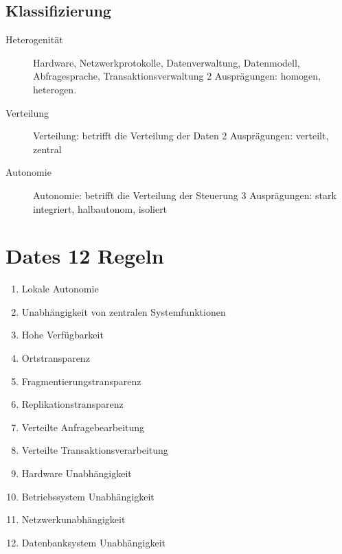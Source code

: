 \documentclass[a4paper,10pt,titlepage=false]{scrreprt}
\begin{document}
\subsection{Klassifizierung}
\begin{description}
 \item [Heterogenität] Hardware, Netzwerkprotokolle,
Datenverwaltung, Datenmodell, Abfragesprache,
Transaktionsverwaltung
2 Ausprägungen: homogen, heterogen.
\item[Verteilung]Verteilung: betrifft die Verteilung der Daten
2 Ausprägungen: verteilt, zentral
\item[Autonomie] Autonomie: betrifft die Verteilung der Steuerung
3 Ausprägungen: stark integriert, halbautonom,
isoliert
\end{description}
\section{Dates 12 Regeln}
\begin{enumerate}
\item Lokale Autonomie
\item  Unabhängigkeit von zentralen Systemfunktionen
\item Hohe Verfügbarkeit
\item Ortstransparenz
\item  Fragmentierungstransparenz
\item  Replikationstransparenz
\item  Verteilte Anfragebearbeitung
\item Verteilte Transaktionsverarbeitung
\item  Hardware Unabhängigkeit
\item Betriebssystem Unabhängigkeit
\item Netzwerkunabhängigkeit
\item Datenbanksystem Unabhängigkeit
\end{enumerate}
\end{document}

